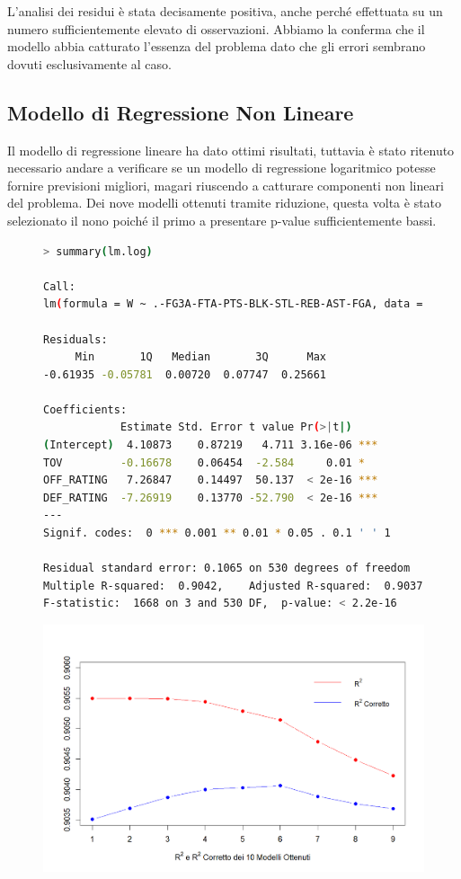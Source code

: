 \documentclass[11pt,a4paper]{article}
\begin{document}
L'analisi dei residui è stata decisamente positiva, anche perché effettuata su un numero sufficientemente elevato di osservazioni. Abbiamo la conferma che il modello abbia catturato l'essenza del problema dato che gli errori sembrano dovuti esclusivamente al caso.

\subsection{Modello di Regressione Non Lineare}
Il modello di regressione lineare ha dato ottimi risultati, tuttavia è stato ritenuto necessario andare a verificare se un modello di regressione logaritmico potesse fornire previsioni migliori, magari riuscendo a catturare componenti non lineari del problema. 
Dei nove modelli ottenuti tramite riduzione, questa volta è stato selezionato il nono poiché il primo a presentare p-value sufficientemente bassi.

\begin{figure}[h]
	\hspace{-2.30cm}
    \begin{minipage}{.6\textwidth} 
	\begin{lstlisting}[language=bash,basicstyle=\tiny,tabsize=2,frame = single]
> summary(lm.log)
        
Call:
lm(formula = W ~ .-FG3A-FTA-PTS-BLK-STL-REB-AST-FGA, data = ldata)
        
Residuals:
     Min       1Q   Median       3Q      Max 
-0.61935 -0.05781  0.00720  0.07747  0.25661 
        
Coefficients:
            Estimate Std. Error t value Pr(>|t|)    
(Intercept)  4.10873    0.87219   4.711 3.16e-06 ***
TOV         -0.16678    0.06454  -2.584     0.01 *  
OFF_RATING   7.26847    0.14497  50.137  < 2e-16 ***
DEF_RATING  -7.26919    0.13770 -52.790  < 2e-16 ***
---
Signif. codes:  0 *** 0.001 ** 0.01 * 0.05 . 0.1 ' ' 1
        
Residual standard error: 0.1065 on 530 degrees of freedom
Multiple R-squared:  0.9042,	Adjusted R-squared:  0.9037 
F-statistic:  1668 on 3 and 530 DF,  p-value: < 2.2e-16
	    \end{lstlisting}
    \end{minipage}
	\begin{minipage}{0.5\textwidth} 
		\includegraphics[scale=.53]{imgs/r2_log_model.png}
	\end{minipage}
\end{figure}
\end{document}
